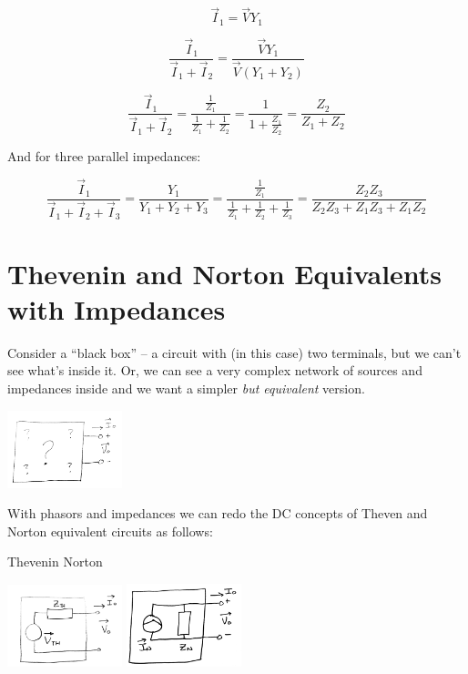 \[
\vec{I}_1 = \vec{V} Y_{1}
\]

\[
\frac {\vec{I}_1}  {\vec I_1+\vec I_2} = \frac {\vec V Y_1}  {\vec V (Y_1+Y_2)}
\]

\[
\frac {\vec{I}_1}  {\vec I_1+\vec I_2} = \frac {\frac {1}  {Z_1}}  {\frac {1}  {Z_1}+\frac {1}  {Z_2}} =
\frac {1}  {1+\frac {Z_1}  {Z_2} } = \frac {Z_2} {Z_1+Z_2}
\]

And for three parallel impedances:


\[
\frac {\vec{I}_1}   {\vec I_1+\vec I_2+\vec I_3} = \frac {Y_1}  {Y_1+Y_2+Y_3} =
\frac {\frac {1}  {Z_1}}  {\frac {1}  {Z_1}+\frac {1}  {Z_2}+\frac {1}  {Z_3}} =
\frac {Z_2 Z_3}  {Z_2 Z_3 + Z_1 Z_3+ Z_1 Z_2}
\]

\section{Thevenin and Norton Equivalents with Impedances}

Consider a ``black box'' -- a circuit with (in this case) two terminals, but we can't see what's inside it.   Or, we can see
a very complex network of sources and impedances inside and we want a simpler {\it but equivalent} version.

\begin{center}
\includegraphics[width=0.25\textwidth]{figsChapt02/AJ40622.png}
\end{center}

With phasors and impedances we can redo the DC concepts of Theven and Norton equivalent circuits as follows:

\vspace{0.2in}
\noindent
\hspace{0.5in}Thevenin \hspace{2.0in} Norton

\includegraphics[width=0.25\textwidth]{figsChapt02/GT93824.png}\hspace{1.0in}
\includegraphics[width=0.25\textwidth]{figsChapt02/UN79919.png}


